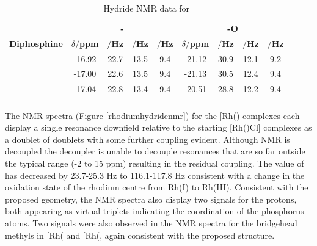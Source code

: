 \begin{table}
\caption[Hydride \proton{} NMR data for \ce{[Rh(\POP)Cl(H)2]}]{Hydride \proton{} NMR data for \texorpdfstring{\ce{[Rh(\POP)Cl(H)2]}}R}
\vspace{1em}
\label{table:dihydrides}
\small
\begin{center}
\begin{tabular}{c c c c c c c c c}
\toprule{}
	~~ & \multicolumn{4}{c}{\bfseries{\ce{H-} \trans-\ce{Cl-}}} & \multicolumn{4}{c}{\bfseries{\ce{H-} \trans-O}}\\
	\cmidrule(lr){2-5} \cmidrule(lr){6-9} 
	\bfseries{Diphosphine}&\bfseries{$\delta/$ppm}&\bfseries{\JRhH$/$Hz}&\bfseries{\JPH$/$Hz}&\bfseries{\JHH$/$Hz}&\bfseries{$\delta/$ppm}&\bfseries{\JRhH$/$Hz}&\bfseries{\JPH$/$Hz}&\bfseries{\JHH$/$Hz}\\
	\midrule{}
	\tBuSixantphos & -16.92 & 22.7 & 13.5 & 9.4 & -21.12 & 30.9 & 12.1 & 9.2 \\
	\tBuThixantphos & -17.00 & 22.6 & 13.5 & 9.4 & -21.13 & 30.5 & 12.4 & 9.4 \\
	\tBuXantphos & -17.04 & 22.8 & 13.4 & 9.4 & -20.51 & 28.8 & 12.2 & 9.4 \\
	\bottomrule{}
\end{tabular}
\end{center} 
\end{table}

The \phosphorus{} NMR spectra (Figure \ref{rhodiumhydridenmr}) for the [Rh(\tBuxantphosk)\ce{(H)2Cl]} complexes each display a single resonance downfield relative to the starting [Rh(\tBuxantphosk)Cl] complexes as a doublet of doublets with some further coupling evident.  Although \phosphorus{} NMR is \proton{} decoupled the decoupler is unable to decouple resonances that are so far outside the typical \proton{} range (-2 to 15 ppm) resulting in the residual coupling.  The value of \JRhP{} has decreased by 23.7-25.3 Hz to 116.1-117.8 Hz consistent with a change in the oxidation state of the rhodium centre from Rh(I) to Rh(III).  Consistent with the proposed geometry, the \proton{} NMR spectra also display two signals for the \tBu{} protons, both appearing as virtual triplets indicating the \trans{} coordination of the phosphorus atoms.  Two signals were also observed in the \proton{} NMR spectra for the bridgehead methyls in [Rh(\tBuxantphosk\ce{)(H)2Cl]} and [Rh(\tBusixantphosk\ce{)(H)2Cl]}, again consistent with the proposed structure.  

